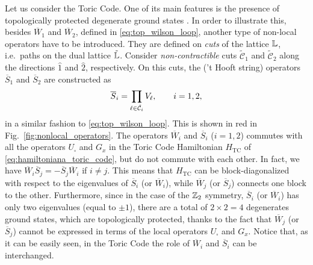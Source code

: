 Let us consider the Toric Code.
One of its main features is the presence of topologically protected degenerate ground states \cite{kitaev2003fault}.
In order to illustrate this, besides $\overline{W}_1$ and $\overline{W}_2$, defined in \eqref{eq:top_wilson_loop}, another type of non-local operators have to be introduced.
They are defined on \emph{cuts} of the lattice $\mathbb{L}$, i.e.~paths on the dual lattice $\tilde{\mathbb{L}}$.
Consider \emph{non-contractible} cuts $\tilde{\mathcal{C}}_1$ and $\tilde{\mathcal{C}}_2$ along the directions $\hat{1}$ and $\hat{2}$, respectively.
On this cuts, the ('t Hooft string) operators $\overline{S}_1$ and $\overline{S}_2$ are constructed as
\begin{equation}
    \overline{S}_i = \prod_{\ell \in \tilde{\mathcal{C}}_i} V_\ell, \qquad i=1,2,
    \label{eq:top_string_operators}
\end{equation}
in a similar fashion to \eqref{eq:top_wilson_loop}.
This is shown in red in Fig.~\ref{fig:nonlocal_operators}.
The operators $\overline{W}_i$ and $\overline{S}_i$ ($i=1,2$) commutes with all the operators $U_{\square}$ and $G_x$ in the Toric Code Hamiltonian $H_{\text{TC}}$ of \eqref{eq:hamiltoniana_toric_code}, but do not commute with each other.
In fact, we have $\overline{W}_i \overline{S}_j = - \overline{S}_j \overline{W}_i$ if $i \neq j$.
This means that $H_{\text{TC}}$ can be block-diagonalized with respect to the eigenvalues of $\overline{S}_i$ (or $\overline{W}_i$), while $\overline{W}_j$ (or $\overline{S}_j$) connects one block to the other.
Furthermore, since in the case of the  $\mathbb{Z}_2$ symmetry,
$\overline{S}_i$ (or $\overline{W}_i$) has only two eigenvalues (equal to $\pm 1$), there are a total of $2 \times 2 = 4$ degenerates ground states, which are topologically protected, thanks to the fact
that $\overline{W}_j$ (or $\overline{S}_j$) cannot be expressed in terms of the local operators $U_{\square}$ and $G_x$.
Notice that, as it can be easily seen, in the Toric Code the role of $\overline{W}_i$ and $\overline{S}_i$ can be interchanged.

